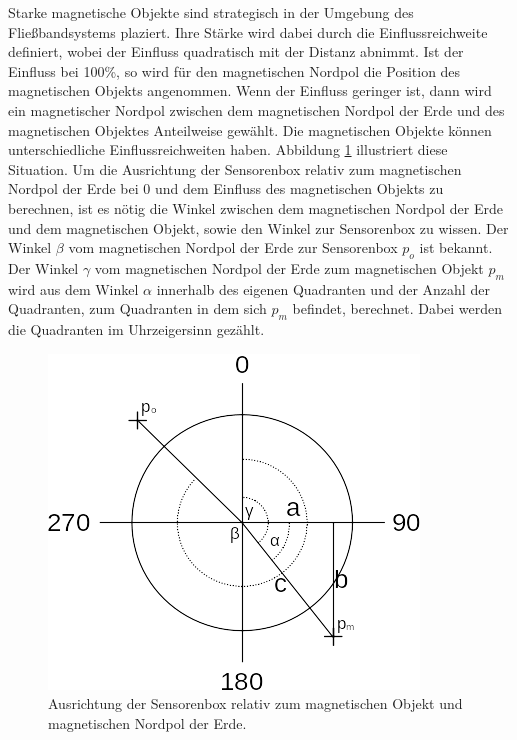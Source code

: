 \newline
\newline
Starke magnetische Objekte sind strategisch in der Umgebung des Fließbandsystems plaziert.
Ihre Stärke wird dabei durch die Einflussreichweite definiert, wobei der Einfluss quadratisch mit der Distanz abnimmt.
Ist der Einfluss bei 100\%, so wird für den magnetischen Nordpol die Position des magnetischen Objekts angenommen.
Wenn der Einfluss geringer ist, dann wird ein magnetischer Nordpol zwischen dem magnetischen Nordpol der Erde und des magnetischen Objektes Anteilweise gewählt.
Die magnetischen Objekte können unterschiedliche Einflussreichweiten haben.
\newline
\newline
Abbildung \ref{fig:magnetic_model} illustriert diese Situation.
Um die Ausrichtung der Sensorenbox relativ zum magnetischen Nordpol der Erde bei 0 und dem Einfluss des magnetischen Objekts zu berechnen,
ist es nötig die Winkel zwischen dem magnetischen Nordpol der Erde und dem magnetischen Objekt, sowie den Winkel zur Sensorenbox zu wissen.
Der Winkel $\beta$ vom magnetischen Nordpol der Erde zur Sensorenbox $p_{o}$ ist bekannt.
Der Winkel $\gamma$ vom magnetischen Nordpol der Erde zum magnetischen Objekt $p_{m}$ wird aus dem Winkel $\alpha$ innerhalb des eigenen Quadranten
und der Anzahl der Quadranten, zum Quadranten in dem sich $p_{m}$ befindet, berechnet.
Dabei werden die Quadranten im Uhrzeigersinn gezählt.
\begin{figure}[h!]
    \centering
    \includegraphics[width=0.7\linewidth]{images/magnetic_model.png}
    \caption{Ausrichtung der Sensorenbox relativ zum magnetischen Objekt und magnetischen Nordpol der Erde.}
    \label{fig:magnetic_model}
\end{figure}
